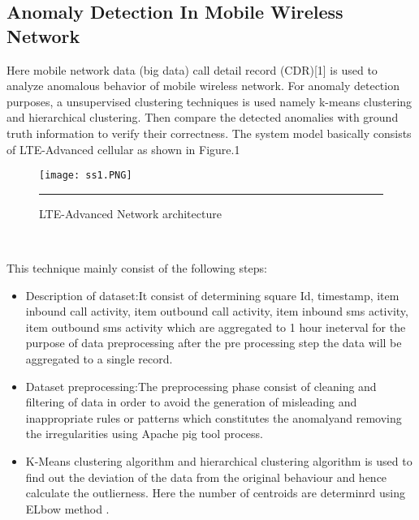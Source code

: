 \documentclass[10pt,a4paper,journal]{IEEEtran}
\begin{document}
\subsection{Anomaly  Detection  In  Mobile  Wireless  Network
}
\par Here mobile network data (big data) call detail record (CDR)[1] is used  to analyze anomalous behavior of mobile wireless network. For anomaly detection purposes, a unsupervised clustering techniques is used namely k-means clustering and hierarchical clustering. Then compare the detected anomalies with ground truth information to verify their correctness. The system model basically consists of LTE-Advanced cellular as shown in Figure.1
\begin{figure}[htbp]
	\centering
	\texttt{[image: ss1.PNG]} \rule{25em}{0.5pt}
	\caption[Registration Phase in MDA]{LTE-Advanced Network architecture \cite{1}}
\label{Fig 1}
 \end{figure}

\\
\par This technique mainly consist of the following steps:
\begin{itemize}
    \item Description of dataset:It consist of determining square Id, timestamp, item inbound call activity, item outbound call activity, item inbound sms activity, item outbound sms activity which are aggregated to 1 hour ineterval for the purpose of data preprocessing after the pre processing step the data will be aggregated to a single record.  
    \item Dataset preprocessing:The preprocessing phase consist of cleaning and filtering of data in order to avoid the generation of misleading and inappropriate rules or patterns which constitutes the anomalyand removing the irregularities using Apache pig tool \cite{15} process.
    \item K-Means clustering \cite{6} algorithm and hierarchical clustering algorithm is used to find out the deviation of the data from the original behaviour and hence calculate the outlierness. Here the number of centroids are determinrd using ELbow method \cite{7}.
\end{itemize}
\end{document}
